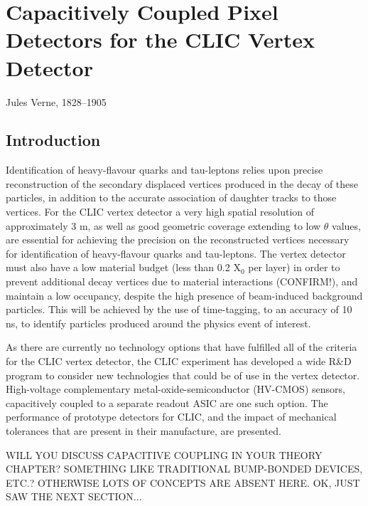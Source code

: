 \chapter{Capacitively Coupled Pixel Detectors for the CLIC Vertex Detector}
\label{chap:theory}

{Jules Verne, 1828--1905}


\section{Introduction}
Identification of heavy-flavour quarks and tau-leptons relies upon precise reconstruction of the secondary displaced vertices produced in the decay of these particles, in addition to the accurate association of daughter tracks to those vertices.  For the CLIC vertex detector a very high spatial resolution of approximately 3 {\mu}m, as well as good geometric coverage extending to low $\theta$ values, are essential for achieving the precision on the reconstructed vertices necessary for identification of heavy-flavour quarks and tau-leptons.  The vertex detector must also have a low material budget (less than 0.2 $\text{X}_{0}$ per layer) in order to prevent additional decay vertices due to material interactions (CONFIRM!), and maintain a low occupancy, despite the high presence of beam-induced background particles. This will be achieved by the use of time-tagging, to an accuracy of 10 ns, to identify particles produced around the physics event of interest.  

As there are currently no technology options that have fulfilled all of the criteria for the CLIC vertex detector, the CLIC experiment has developed a wide R\&D program to consider  new technologies that could be of use in the vertex detector. High-voltage complementary metal-oxide-semiconductor (HV-CMOS) sensors, capacitively coupled to a separate readout ASIC are one such option. The performance of prototype detectors for CLIC, and the impact of mechanical tolerances that are present in their manufacture, are presented.  

WILL YOU DISCUSS CAPACITIVE COUPLING IN YOUR THEORY CHAPTER? SOMETHING LIKE TRADITIONAL BUMP-BONDED DEVICES, ETC.? OTHERWISE LOTS OF CONCEPTS ARE ABSENT HERE. OK, JUST SAW THE NEXT SECTION... 

